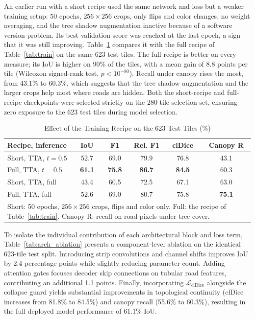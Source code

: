 \documentclass{ieeeaccess}
\begin{document}
An earlier run with a short recipe used the same network and loss but a weaker training setup: 50 epochs, $256 \times 256$ crops, only flips and color changes, no weight averaging, and the tree shadow augmentation inactive because of a software version problem. Its best validation score was reached at the last epoch, a sign that it was still improving. Table~\ref{tab:recipe} compares it with the full recipe of Table~\ref{tab:train} on the same 623 test tiles. The full recipe is better on every measure; its IoU is higher on 90\% of the tiles, with a mean gain of 8.8 points per tile (Wilcoxon signed-rank test, $p < 10^{-80}$). Recall under canopy rises the most, from 43.1\% to 60.3\%, which suggests that the tree shadow augmentation and the larger crops help most where roads are hidden. Both the short-recipe and full-recipe checkpoints were selected strictly on the 280-tile selection set, ensuring zero exposure to the 623 test tiles during model selection.

\begin{table}[t]
\caption{Effect of the Training Recipe on the 623 Test Tiles (\%)}
\label{tab:recipe}
\setlength{\tabcolsep}{2pt}
\tablebodyfont
\begin{tabular}{|l|c|c|c|c|c|}
\hline
Recipe, inference & IoU & F1 & Rel. F1 & clDice & Canopy R \\
\hline
Short, TTA, $t = 0.5$ & 52.7 & 69.0 & 79.9 & 76.8 & 43.1 \\
Full, TTA, $t = 0.5$ & \textbf{61.1} & \textbf{75.8} & \textbf{86.7} & \textbf{84.5} & 60.3 \\
Short, TTA, full & 43.4 & 60.5 & 72.5 & 67.1 & 63.0 \\
Full, TTA, full & 52.6 & 69.0 & 80.7 & 75.8 & \textbf{75.1} \\
\hline
\multicolumn{6}{p{215pt}}{Short: 50 epochs, $256 \times 256$ crops, flips and color only. Full: the recipe of Table~\ref{tab:train}. Canopy R: recall on road pixels under tree cover.}
\end{tabular}
\end{table}

To isolate the individual contribution of each architectural block and loss term, Table~\ref{tab:arch_ablation} presents a component-level ablation on the identical 623-tile test split. Introducing strip convolutions and channel shifts improves IoU by 2.4 percentage points while slightly reducing parameter count. Adding attention gates focuses decoder skip connections on tubular road features, contributing an additional 1.1 points. Finally, incorporating $\mathcal{L}_{\mathrm{clDice}}$ alongside the collapse guard yields substantial improvements in topological continuity (clDice increases from 81.8\% to 84.5\%) and canopy recall (55.6\% to 60.3\%), resulting in the full deployed model performance of 61.1\% IoU.
\end{document}
